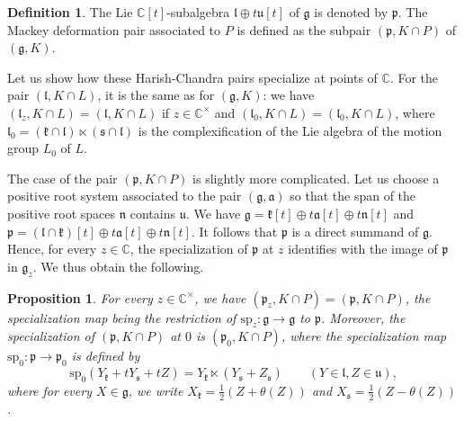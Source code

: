\documentclass{amsart}
\newtheorem{proposition}[theorem]{Proposition}
\theoremstyle{definition}
\newtheorem{definition}[theorem]{Definition}
\begin{document}
\begin{definition}
    The Lie $\mathbb{C}[t]$-subalgebra $\bm{\mathfrak{l}} \oplus t \mathfrak{u}[t]$ of $\bm{\mathfrak{g}}$ is denoted by $\bm{\mathfrak{p}}$. The Mackey deformation pair associated to $P$ is defined as the subpair $(\bm{\mathfrak{p}},K\cap P)$ of $(\bm{\mathfrak{g}},K)$.
\end{definition}

Let us show how these Harish-Chandra pairs specialize at points of $\mathbb{C}$. For the pair $(\bm{\mathfrak{l}},K\cap L)$, it is the same as for $(\bm{\mathfrak{g}},K)$: we have $(\bm{\mathfrak{l}}_z,K\cap L) = (\mathfrak{l},K\cap L)$ if $z\in \mathbb{C}^\times$ and $(\bm{\mathfrak{l}}_0,K\cap L) = (\mathfrak{l}_0,K\cap L)$, where $\mathfrak{l}_0 = (\mathfrak{k}\cap \mathfrak{l}) \ltimes (\mathfrak{s}\cap \mathfrak{l})$ is the complexification of the Lie algebra of the motion group $L_0$ of $L$.

The case of the pair $(\bm{\mathfrak{p}}, K\cap P)$ is slightly more complicated. Let us choose a positive root system associated to the pair $(\mathfrak{g},\mathfrak{a})$ so that the span of the positive root spaces $\mathfrak{n}$ contains $\mathfrak{u}$. We have $\bm{\mathfrak{g}} = \mathfrak{k}[t] \oplus t\mathfrak{a}[t] \oplus t\mathfrak{n}[t]$ and $\bm{\mathfrak{p}} = (\mathfrak{l}\cap \mathfrak{k})[t] \oplus t\mathfrak{a}[t] \oplus t\mathfrak{n}[t]$. It follows that $\bm{\mathfrak{p}}$ is a direct summand of $\bm{\mathfrak{g}}$. Hence, for every $z \in \mathbb{C}$, the specialization of $\bm{\mathfrak{p}}$ at $z$ identifies with the image of $\bm{\mathfrak{p}}$ in $\bm{\mathfrak{g}}_z$. We thus obtain the following.

\begin{proposition}\label{specialization_P_at_0}
    For every $z \in \mathbb{C}^\times$, we have $(\bm{\mathfrak{p}}_z, K\cap P) = (\mathfrak{p}, K\cap P)$, the specialization map being the restriction of $\mathrm{sp}_z : \bm{\mathfrak{g}} \to \mathfrak{g}$ to $\bm{\mathfrak{p}}$. Moreover, the specialization of $(\bm{\mathfrak{p}},K\cap P)$ at $0$ is $(\mathfrak{p}_0, K\cap P)$, where the specialization map $\mathrm{sp}_0 : \bm{\mathfrak{p}} \to \mathfrak{p}_0$ is defined by
\[\mathrm{sp}_0(Y_\mathfrak{k} + t Y_\mathfrak{s} +tZ) = Y_\mathfrak{k} \ltimes (Y_\mathfrak{s} + Z_\mathfrak{s})\qquad (Y \in \mathfrak{l}, Z \in \mathfrak{u}),\]
where for every $X \in \mathfrak{g}$, we write $X_\mathfrak{k} = \tfrac{1}{2} (Z+\theta(Z))$ and $X_\mathfrak{s} = \tfrac{1}{2} (Z-\theta(Z))$.
\end{proposition}
\end{document}
